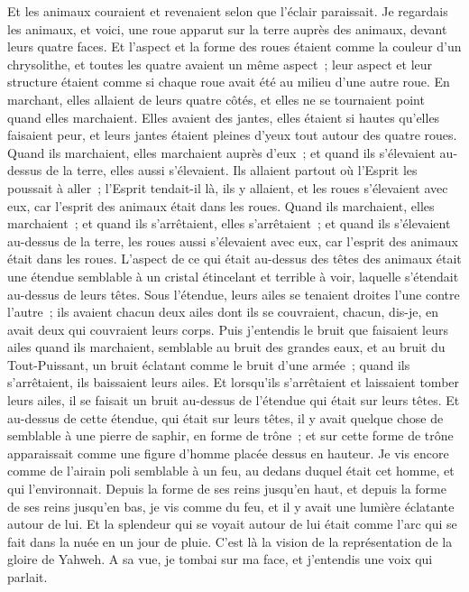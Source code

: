 \begin{multicols}{2}
Et les animaux couraient et revenaient selon que l'éclair paraissait.
Je regardais les animaux, et voici, une roue apparut sur la terre auprès des animaux, devant leurs quatre faces.
Et l'aspect et la forme des roues étaient comme la couleur d'un chrysolithe, et toutes les quatre avaient un même aspect~; leur aspect et leur structure étaient comme si chaque roue avait été au milieu d'une autre roue.
En marchant, elles allaient de leurs quatre côtés, et elles ne se tournaient point quand elles marchaient.
Elles avaient des jantes, elles étaient si hautes qu'elles faisaient peur, et leurs jantes étaient pleines d'yeux tout autour des quatre roues.
Quand ils marchaient, elles marchaient auprès d'eux~; et quand ils s'élevaient au-dessus de la terre, elles aussi s'élevaient.
Ils allaient partout où l'Esprit les poussait à aller~; l'Esprit tendait-il là, ils y allaient, et les roues s'élevaient avec eux, car l'esprit des animaux était dans les roues.
Quand ils marchaient, elles marchaient~; et quand ils s'arrêtaient, elles s'arrêtaient~; et quand ils s'élevaient au-dessus de la terre, les roues aussi s'élevaient avec eux, car l'esprit des animaux était dans les roues.
L'aspect de ce qui était au-dessus des têtes des animaux était une étendue semblable à un cristal étincelant et terrible à voir, laquelle s'étendait au-dessus de leurs têtes.
Sous l'étendue, leurs ailes se tenaient droites l'une contre l'autre~; ils avaient chacun deux ailes dont ils se couvraient, chacun, dis-je, en avait deux qui couvraient leurs corps.
Puis j'entendis le bruit que faisaient leurs ailes quand ils marchaient, semblable au bruit des grandes eaux, et au bruit du Tout-Puissant, un bruit éclatant comme le bruit d'une armée~; quand ils s'arrêtaient, ils baissaient leurs ailes.
Et lorsqu'ils s'arrêtaient et laissaient tomber leurs ailes, il se faisait un bruit au-dessus de l'étendue qui était sur leurs têtes.
Et au-dessus de cette étendue, qui était sur leurs têtes, il y avait quelque chose de semblable à une pierre de saphir, en forme de trône~; et sur cette forme de trône apparaissait comme une figure d'homme placée dessus en hauteur.
Je vis encore comme de l'airain poli semblable à un feu, au dedans duquel était cet homme, et qui l'environnait. Depuis la forme de ses reins jusqu'en haut, et depuis la forme de ses reins jusqu'en bas, je vis comme du feu, et il y avait une lumière éclatante autour de lui.
Et la splendeur qui se voyait autour de lui était comme l'arc qui se fait dans la nuée en un jour de pluie. C'est là la vision de la représentation de la gloire de Yahweh. A sa vue, je tombai sur ma face, et j'entendis une voix qui parlait.

\end{multicols}

